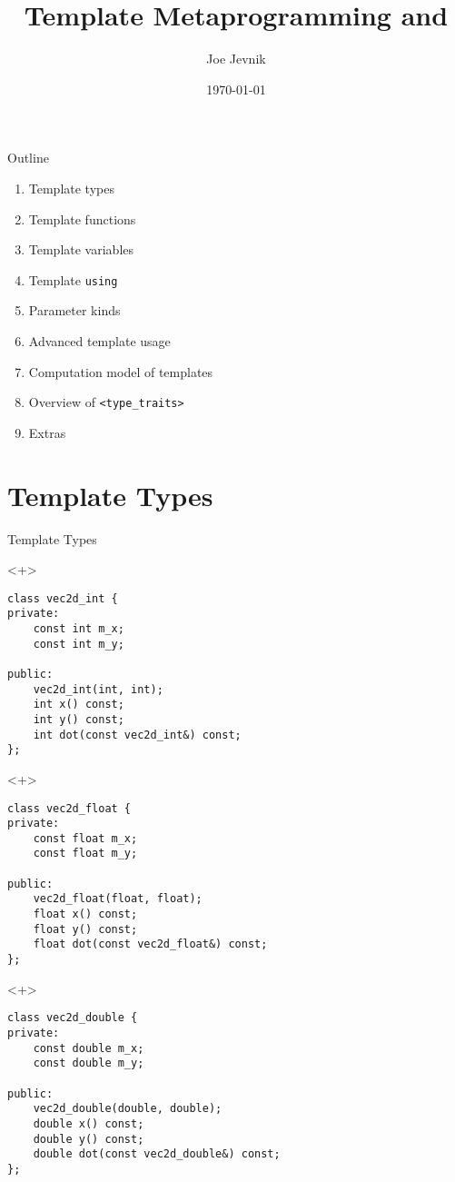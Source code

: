 \documentclass[table]{beamer}
\title{Template Metaprogramming and \typetraits}
\date{\today}
\author{Joe Jevnik}
\institute{Boston C++}
\newcommand{\typetraits}{\texttt{<type\_traits>}}
\begin{document}
\maketitle

\begin{frame}{Outline}
  \begin{enumerate}
  \item Template types
  \item Template functions
  \item Template variables
  \item Template \texttt{using}
  \item Parameter kinds
  \item Advanced template usage
  \item Computation model of templates
  \item Overview of \typetraits
  \item Extras
  \end{enumerate}
\end{frame}

\section{Template Types}

\begin{frame}[fragile]{Template Types}
  \begin{onlyenv}<+>
    \begin{verbatim}
class vec2d_int {
private:
    const int m_x;
    const int m_y;

public:
    vec2d_int(int, int);
    int x() const;
    int y() const;
    int dot(const vec2d_int&) const;
};
    \end{verbatim}
  \end{onlyenv}

  \begin{onlyenv}<+>
    \begin{verbatim}
class vec2d_float {
private:
    const float m_x;
    const float m_y;

public:
    vec2d_float(float, float);
    float x() const;
    float y() const;
    float dot(const vec2d_float&) const;
};
    \end{verbatim}
  \end{onlyenv}

  \begin{onlyenv}<+>
    \begin{verbatim}
class vec2d_double {
private:
    const double m_x;
    const double m_y;

public:
    vec2d_double(double, double);
    double x() const;
    double y() const;
    double dot(const vec2d_double&) const;
};
    \end{verbatim}
  \end{onlyenv}
\end{frame}
\end{document}
